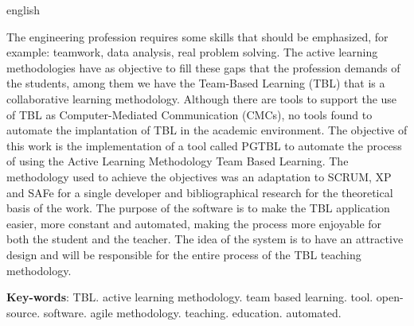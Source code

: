 \begin{resumo}[Abstract]
 \begin{otherlanguage*}{english}

   The engineering profession requires some skills that should be emphasized, for example: teamwork, data analysis, real
   problem solving. The active learning methodologies have as objective to fill these gaps that the profession demands
   of the students, among them we have the Team-Based Learning (TBL) that is a collaborative learning methodology.
   Although there are tools to support the use of TBL as Computer-Mediated Communication (CMCs), no tools found to
   automate the implantation of TBL in the academic environment. The objective of this work is the
   implementation of a tool called PGTBL to automate the process of using the Active Learning Methodology Team Based
   Learning. The methodology used to achieve the objectives was an adaptation to SCRUM, XP and SAFe for a single
   developer and bibliographical research for the theoretical basis of the work. The purpose of the software is to make
   the TBL application easier, more constant and automated, making the process more enjoyable for both the student and
   the teacher. The idea of the system is to have an attractive design and will be responsible for the
   entire process of the TBL teaching methodology.

   \vspace{\onelineskip}

   \noindent
   \textbf{Key-words}: TBL. active learning methodology. team based learning. tool. open-source. software. agile
   methodology. teaching. education. automated.
 \end{otherlanguage*}
\end{resumo}
